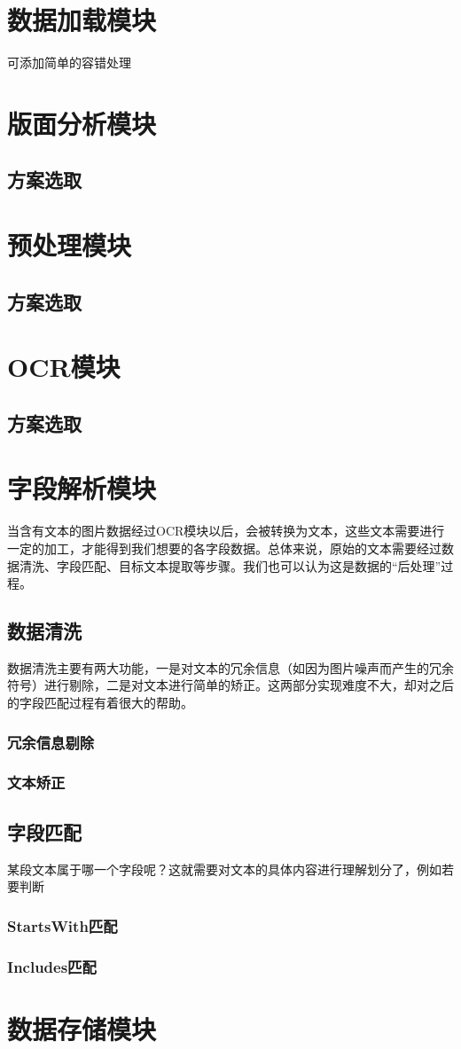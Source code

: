 \section{数据加载模块}  %
可添加简单的容错处理

\section{版面分析模块}  %
\subsection{方案选取}


\section{预处理模块}     %
\subsection{方案选取}


\section{OCR模块}     %
\subsection{方案选取}

\section{字段解析模块}  %
当含有文本的图片数据经过OCR模块以后，会被转换为文本，这些文本需要进行一定的加工，才能得到我们想要的各字段数据。总体来说，原始的文本需要经过数据清洗、字段匹配、目标文本提取等步骤。我们也可以认为这是数据的“后处理”过程。

\subsection{数据清洗}
数据清洗主要有两大功能，一是对文本的冗余信息（如因为图片噪声而产生的冗余符号）进行剔除，二是对文本进行简单的矫正。这两部分实现难度不大，却对之后的字段匹配过程有着很大的帮助。
\subsubsection{冗余信息剔除}
\subsubsection{文本矫正}

\subsection{字段匹配}
某段文本属于哪一个字段呢？这就需要对文本的具体内容进行理解划分了，例如若要判断
\subsubsection{StartsWith匹配}
\subsubsection{Includes匹配}


\section{数据存储模块} %
